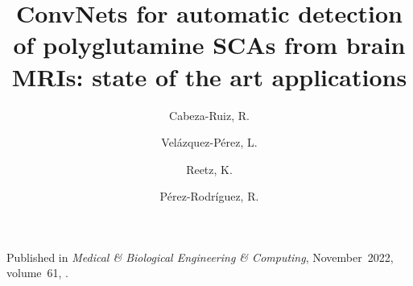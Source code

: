 \author
{
    Cabeza-Ruiz, R.
    \and
    Velázquez-Pérez, L.
    \and
    Reetz, K.
    \and
    Pérez-Rodríguez, R.
}
\title{ConvNets for automatic detection of polyglutamine SCAs from brain MRIs: state of the art applications}
\metadata
{
    Published in \emph{Medical \& Biological Engineering \& Computing},
    November~2022,
    volume~61,
    .
}
\maketitle
\label{pap:fourth}
